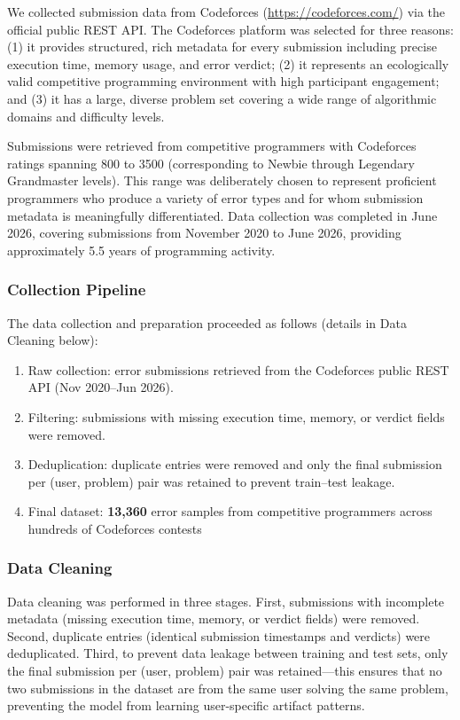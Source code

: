 \documentclass[acmsmall]{acmart}
\begin{document}
We collected submission data from Codeforces (\url{https://codeforces.com/})
via the official public REST API. The Codeforces
platform was selected for three reasons: (1) it provides structured, rich
metadata for every submission including precise execution time, memory usage,
and error verdict; (2) it represents an ecologically valid competitive
programming environment with high participant engagement; and (3) it has a
large, diverse problem set covering a wide range of algorithmic domains and
difficulty levels.

Submissions were retrieved from competitive programmers with Codeforces
ratings spanning 800 to 3500 (corresponding to Newbie through Legendary
Grandmaster levels). This range was deliberately chosen to represent
proficient programmers who produce a variety of error types and for whom
submission metadata is meaningfully differentiated. Data collection was
completed in June 2026, covering submissions from November 2020 to June
2026, providing approximately 5.5 years of programming activity.

\subsubsection*{Collection Pipeline}
The data collection and preparation proceeded as follows (details in
Data Cleaning below):
\begin{enumerate}
    \item Raw collection: error submissions retrieved from the
          Codeforces public REST API (Nov 2020--Jun 2026).
    \item Filtering: submissions with missing execution time, memory, or
          verdict fields were removed.
    \item Deduplication: duplicate entries were removed and only the final
          submission per (user, problem) pair was retained to prevent
          train--test leakage.
    \item Final dataset: \textbf{13,360} error samples from competitive
          programmers across hundreds of Codeforces contests
\end{enumerate}

\subsubsection*{Data Cleaning}
Data cleaning was performed in three stages. First, submissions with
incomplete metadata (missing execution time, memory, or verdict fields) were
removed. Second, duplicate entries (identical submission timestamps and
verdicts) were deduplicated. Third, to prevent data leakage between training
and test sets, only the final submission per (user, problem) pair was
retained---this ensures that no two submissions in the dataset are from the
same user solving the same problem, preventing the model from learning
user-specific artifact patterns.
\end{document}
